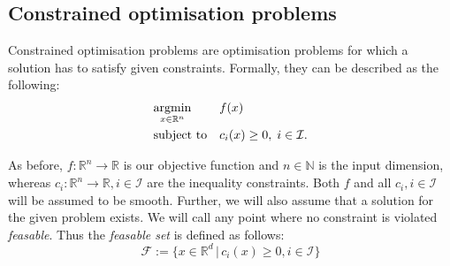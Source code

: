 \subsection{Constrained optimisation problems}
Constrained optimisation problems are optimisation problems for which a solution has to satisfy given constraints. Formally, they can be described as the following:\\
\begin{equation}
	\label{constrained_min_problem}
	\begin{aligned}
		& \underset{x \in \mathbb{R}^n}{\operatorname*{argmin}}
		& & f(x) \\
		& \text{subject to}
		& & c_i(x) \geq 0, \; i \in \mathcal{I}.
	\end{aligned}
\end{equation}

As before, $f\colon \mathbb{R}^n\to \mathbb{R}$ is our objective function and $n \in \mathbb{N}$ is the input dimension, whereas $c_i\colon \mathbb{R}^n\to \mathbb{R}, i \in \mathcal{I}$ are the inequality constraints. Both $f$ and all $c_i, i \in \mathcal{I}$ will be assumed to be smooth. Further, we will also assume that a solution for the given problem exists. We will call any point where no constraint is violated \textit{feasable}. Thus the \textit{feasable set} is defined as follows:
\[ \mathcal{F} := \{x \in \mathbb{R}^d \,|\, c_i(x) \geq 0, i\in \mathcal{I} \} \]

